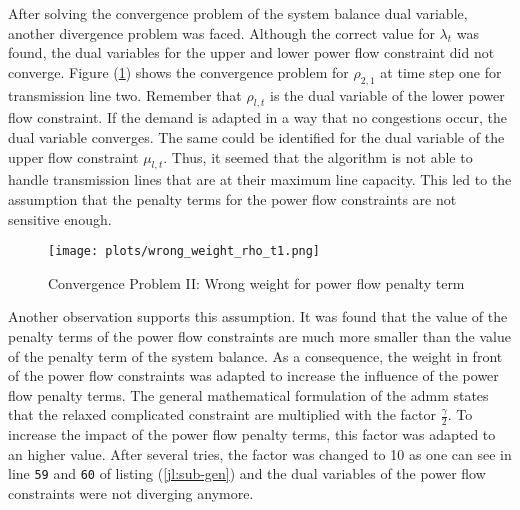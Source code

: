 After solving the convergence problem of the system balance dual variable, another divergence problem was faced. Although the correct value for $\lambda_t$ was found, the dual variables for the upper and lower power flow constraint did not converge. Figure (\ref{fig:conv-problem-2}) shows the convergence problem for $\rho_{2,1}$ at time step one for transmission line two. Remember that $\rho_{l,t}$ is the dual variable of the lower power flow constraint. If the demand is adapted in a way that no congestions occur, the dual variable converges. The same could be identified for the dual variable of the upper flow constraint $\mu_{l,t}$. Thus, it seemed that the algorithm is not able to handle transmission lines that are at their maximum line capacity. This led to the assumption that the penalty terms for the power flow constraints are not sensitive enough. \\

\begin{figure}[h!]
	\centering
	\texttt{[image: plots/wrong\_weight\_rho\_t1.png]}
	\caption{Convergence Problem II: Wrong weight for power flow penalty term}
	\label{fig:conv-problem-2}
\end{figure}

Another observation supports this assumption. It was found that the value of the penalty terms of the power flow constraints are much more smaller than the value of the penalty term of the system balance. As a consequence, the weight in front of the power flow constraints was adapted to increase the influence of the power flow penalty terms. The general mathematical formulation of the \gls{admm} states that the relaxed complicated constraint are multiplied with the factor $\frac{\gamma}{2}$. To increase the impact of the power flow penalty terms, this factor was adapted to an higher value. After several tries, the factor was changed to 10 as one can see in line \texttt{59} and \texttt{60} of listing (\ref{jl:sub-gen}) and the dual variables of the power flow constraints were not diverging anymore. \\

